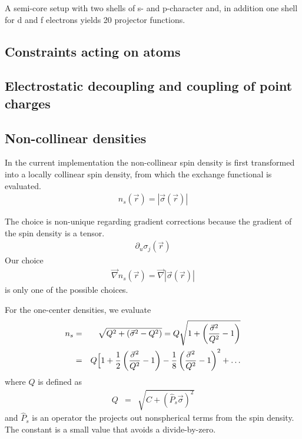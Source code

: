 \documentclass[final,12pt,makeidx,DIV=calc]{article}
\begin{document}
{{{{{{A semi-core setup with two shells of s- and p-character and, in
addition one shell for d and f electrons yields 20 projector
functions.




\subsection{Constraints acting on atoms}


\subsection{Electrostatic decoupling and coupling of point charges}

\subsection{Non-collinear densities}
\label{sec:noncollinear}
In the current implementation the non-collinear spin density is first
transformed into a locally collinear spin density, from which the
exchange functional is evaluated. 
\begin{eqnarray*}
n_s(\vec{r})= |\vec{\sigma}(\vec{r})|
\end{eqnarray*}

The choice is non-unique regarding gradient corrections because the
gradient of the spin density is a tensor.
\begin{eqnarray*}
\partial_u\sigma_j(\vec{r})
\end{eqnarray*}
Our choice
\begin{eqnarray*}
\vec{\nabla}n_s(\vec{r})=\vec{\nabla}|\vec{\sigma}(\vec{r})|
\end{eqnarray*}
is only one of the possible choices. 


For the one-center densities, we evaluate
\begin{eqnarray*}
n_s&=&\sqrt{Q^2+\left(\vec{\sigma}^2-Q^2\right)}
=Q\sqrt{1+\left(\frac{\vec{\sigma}^2}{Q^2}-1\right)}
\\
&=&Q\Bigl[1+\frac{1}{2}\left(\frac{\vec{\sigma}^2}{Q^2}-1\right)
-\frac{1}{8}\left(\frac{\vec{\sigma}^2}{Q^2}-1\right)^2+\ldots
\end{eqnarray*}
where $Q$ is defined as
\begin{eqnarray*}
Q&=&\sqrt{C+(\hat{P}_s\vec{\sigma})^2}
\end{eqnarray*}
and $\hat{P}_s$ is an operator the projects out nonspherical terms
from the spin density. The constant is a small value that avoids a 
divide-by-zero.

}}}}}}
\end{document}
